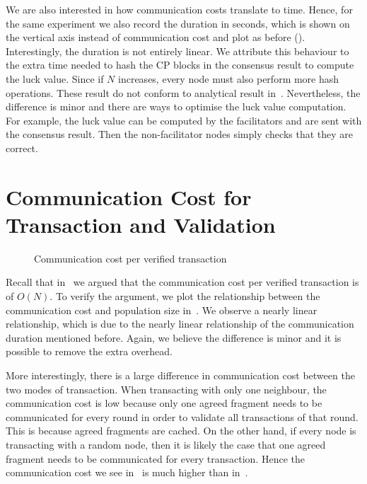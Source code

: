 We are also interested in how communication costs translate to time.
Hence, for the same experiment we also record the duration in seconds, which is shown on the vertical axis instead of communication cost and plot as before ().
Interestingly, the duration is not entirely linear.
We attribute this behaviour to the extra time needed to hash the CP blocks in the consensus result to compute the luck value.
Since if $N$ increases, every node must also perform more hash operations.
These result do not conform to analytical result in~.
Nevertheless, the difference is minor and there are ways to optimise the luck value computation.
For example, the luck value can be computed by the facilitators and are sent with the consensus result.
Then the non-facilitator nodes simply checks that they are correct.

\section{Communication Cost for Transaction and Validation}

\begin{figure}[h]
  \centering
  \caption{Communication cost per verified transaction}
  \label{fig:tx-comms}
\end{figure}

Recall that in~ we argued that the communication cost per verified transaction is of $O(N)$.
To verify the argument, we plot the relationship between the communication cost and population size in~.
We observe a nearly linear relationship, which is due to the nearly linear relationship of the communication duration mentioned before.
Again, we believe the difference is minor and it is possible to remove the extra overhead.

More interestingly, there is a large difference in communication cost between the two modes of transaction.
When transacting with only one neighbour, the communication cost is low because only one agreed fragment needs to be communicated for every round in order to validate all transactions of that round.
This is because agreed fragments are cached.
On the other hand,
if every node is transacting with a random node, then it is likely the case that one agreed fragment needs to be communicated for every transaction.
Hence the communication cost we see in~ is much higher than in~.

